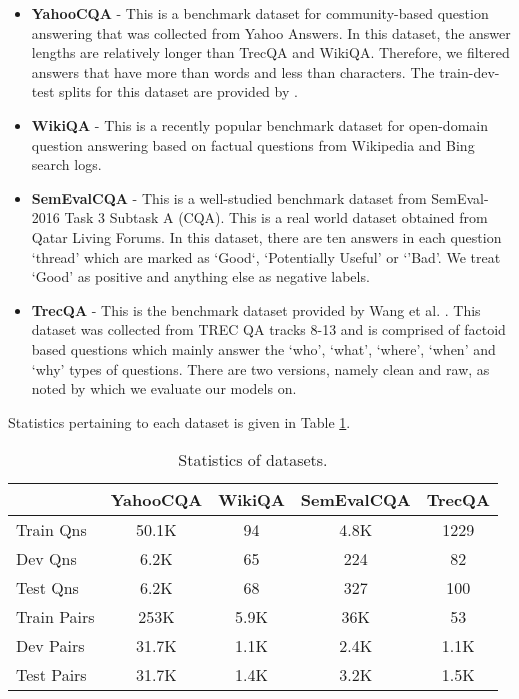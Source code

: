 \documentclass[sigconf]{acmart}
\begin{document}
\begin{itemize}
	\item \textbf{YahooCQA} -  This is a benchmark dataset for community-based question answering that was collected from Yahoo Answers. In this dataset, the answer lengths are relatively longer than TrecQA and WikiQA. Therefore, we filtered answers that have more than  words and less than  characters. The train-dev-test splits for this dataset are provided by \cite{DBLP:conf/sigir/TayPLH17}.

	\item \textbf{WikiQA} - This is a recently popular benchmark dataset \cite{DBLP:conf/emnlp/YangYM15} for open-domain question answering based on factual questions from Wikipedia and Bing search logs.
	\item \textbf{SemEvalCQA} - This is a well-studied benchmark dataset from SemEval-2016 Task 3 Subtask A (CQA). This is a real world dataset obtained from Qatar Living Forums. In this dataset, there are ten answers in each question `thread' which are marked as `Good`, `Potentially Useful' or `'Bad'. We treat `Good' as positive and anything else as negative labels. 
\item \textbf{TrecQA} - This is the benchmark dataset provided by Wang et al. \cite{DBLP:conf/emnlp/WangSM07}. This dataset was collected from TREC QA tracks 8-13 and is comprised of factoid based questions which mainly answer the `who', `what', `where', `when' and `why' types of questions. There are two versions, namely clean and raw, as noted by \cite{DBLP:conf/cikm/RaoHL16} which we evaluate our models on. 

\end{itemize}
Statistics pertaining to each dataset is given in Table \ref{tab:dataset}. 


\begin{table}[H]
  \centering
  \small
    \begin{tabular}{lcccc}
    \hline
         			& YahooCQA & WikiQA & SemEvalCQA   & TrecQA\\
          \hline
    Train Qns &   50.1K  & 94        &  4.8K  & 1229 \\
    Dev Qns & 6.2K & 65      &224    &  82 \\
    Test Qns & 6.2K & 68    &  327   & 100 \\
    \hline
    Train Pairs & 253K& 5.9K   &36K   & 53 \\
    Dev Pairs &31.7K &1.1K   &2.4K  &   1.1K\\
    Test Pairs & 31.7K &  1.4K & 3.2K    & 1.5K \\
    \hline
    \end{tabular}\caption{Statistics of datasets.}
  \label{tab:dataset}\end{table}
\end{document}
